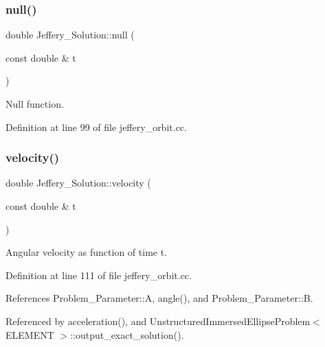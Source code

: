 \mbox{\label{namespaceJeffery__Solution_a6a47b12e9a89f545c7467fae2e6a4350}} 
\subsubsection{\texorpdfstring{null()}{null()}}
{\footnotesize\ttfamily double Jeffery\+\_\+\+Solution\+::null (\begin{DoxyParamCaption}\item[{const double \&}]{t }\end{DoxyParamCaption})}



Null function. 



Definition at line 99 of file jeffery\+\_\+orbit.\+cc.

\mbox{\label{namespaceJeffery__Solution_acf35d547e7d28609a17c66c9a191090b}} 
\subsubsection{\texorpdfstring{velocity()}{velocity()}}
{\footnotesize\ttfamily double Jeffery\+\_\+\+Solution\+::velocity (\begin{DoxyParamCaption}\item[{const double \&}]{t }\end{DoxyParamCaption})}



Angular velocity as function of time t. 



Definition at line 111 of file jeffery\+\_\+orbit.\+cc.



References Problem\+\_\+\+Parameter\+::A, angle(), and Problem\+\_\+\+Parameter\+::B.



Referenced by acceleration(), and Unstructured\+Immersed\+Ellipse\+Problem$<$ E\+L\+E\+M\+E\+N\+T $>$\+::output\+\_\+exact\+\_\+solution().

